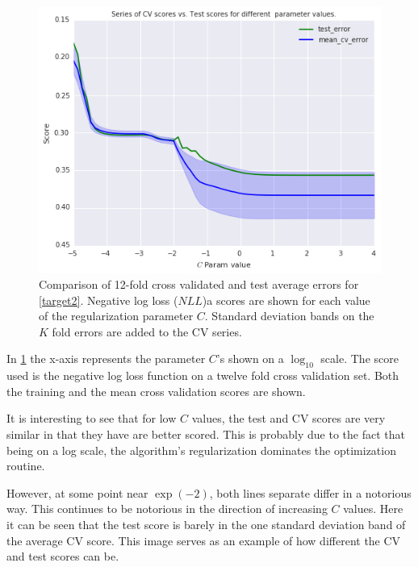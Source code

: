 \begin{figure}[h!]
\begin{center}
\includegraphics[width=1\columnwidth]{figures/cross_validation/train_and_cv_score_comparison_logreg.jpg}
\caption{ Comparison of 12-fold cross validated and test average errors for \cref{target2}. Negative log loss ($NLL$)a scores are shown for each value of the regularization parameter $C$. Standard deviation bands on the $K$ fold errors are added to the CV series.}
\label{fig:cv_vs_test_score}
\end{center}
\end{figure}

In \cref{fig:cv_vs_test_score} the x-axis represents the parameter $C$'s shown on a $\log_{10}$ scale.
The score used is the negative log loss function on a twelve fold cross validation set.
Both the training and the mean cross validation scores are shown.

It is interesting to see that for low $C$ values, the test and CV scores are very similar in that they have are better scored.
This is probably due to the fact that being on a log scale, the algorithm's regularization dominates the optimization routine.

However, at some point near $\exp(-2)$, both lines separate differ in a notorious way.
This continues to be notorious in the direction of increasing $C$ values.
Here it can be seen that the test score is barely in the one standard deviation band of the average CV score.
This image serves as an example of how different the CV and test scores can be.

